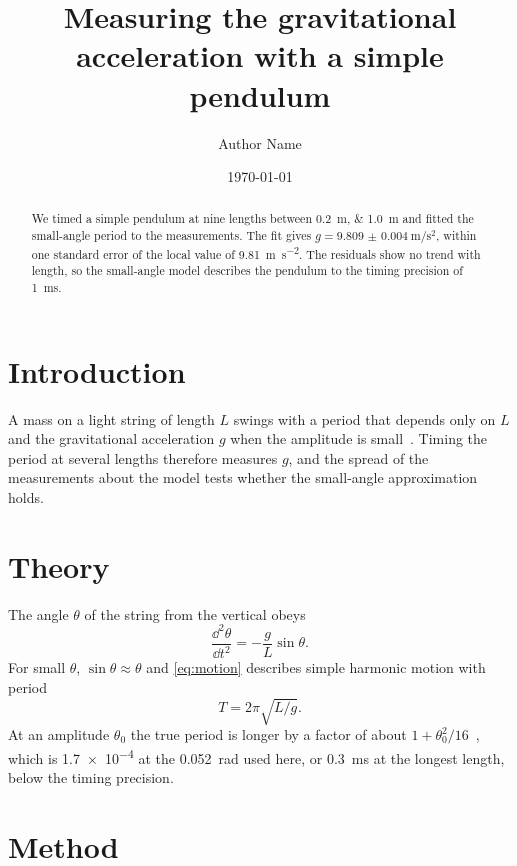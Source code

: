 \documentclass[11pt]{article}
\title{Measuring the gravitational acceleration with a simple pendulum}
\author{Author Name}
\date{\today}
\begin{document}
\maketitle

\begin{abstract}
We timed a simple pendulum at nine lengths between \qtylist{0.2;1.0}{\metre} and fitted the small-angle period to the measurements. The fit gives $g = \qty{9.809(4)}{\metre\per\second\squared}$, within one standard error of the local value of \qty{9.81}{\metre\per\second\squared}. The residuals show no trend with length, so the small-angle model describes the pendulum to the timing precision of \qty{1}{\milli\second}.
\end{abstract}

\section{Introduction}

A mass on a light string of length $L$ swings with a period that depends only on $L$ and the gravitational acceleration $g$ when the amplitude is small~\cite{nelson1986}. Timing the period at several lengths therefore measures $g$, and the spread of the measurements about the model tests whether the small-angle approximation holds.

\section{Theory}

The angle $\theta$ of the string from the vertical obeys
\begin{equation}
  \frac{\dd^2\theta}{\dd t^2} = -\frac{g}{L} \sin\theta .
  \label{eq:motion}
\end{equation}
For small $\theta$, $\sin\theta \approx \theta$ and \cref{eq:motion} describes simple harmonic motion with period
\begin{equation}
  T = 2\pi \sqrt{L/g} .
  \label{eq:period}
\end{equation}
At an amplitude $\theta_0$ the true period is longer by a factor of about $1 + \theta_0^2/16$~\cite{nelson1986}, which is \num{1.7e-4} at the \qty{0.052}{\radian} used here, or \qty{0.3}{\milli\second} at the longest length, below the timing precision.

\section{Method}
\end{document}
